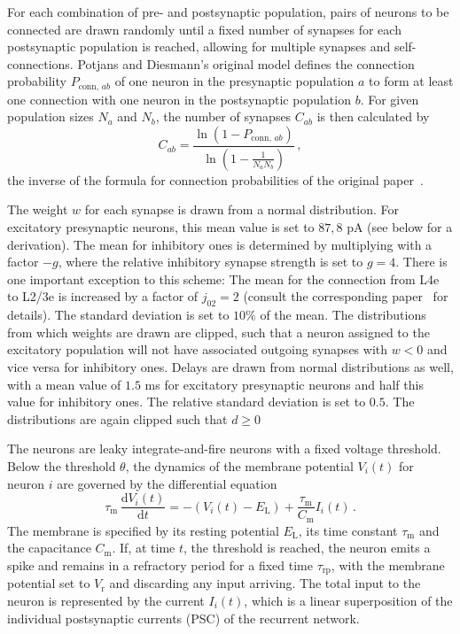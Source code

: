 For each combination of pre- and postsynaptic population, pairs of neurons to be connected are drawn
randomly until a fixed number of synapses for each postsynaptic population is reached, 
allowing for multiple synapses and self-connections. 
Potjans and Diesmann's original model defines the connection probability $P_{\text{conn}, \,ab}$ 
of one neuron in the presynaptic population $a$ to form at least one connection with one neuron in 
the postsynaptic population $b$. For given population sizes $N_a$ and $N_b$, the number of 
synapses $C_{ab}$ is then calculated by
\begin{equation}
    C_{ab} = \frac{\ln \left( 1 - P_{\text{conn}, \,ab} \right)}{\ln \left( 1 - \frac{1}{N_a N_b} \right)} \, ,
    \label{eq:synapse_numbers}
\end{equation}
the inverse of the formula for connection probabilities of the original paper~\cite{potjans2014}.

The weight $w$ for each synapse is drawn from a normal distribution.
For excitatory presynaptic neurons, this mean value is set to $87,8$ pA (see below for 
a derivation). The mean for inhibitory ones is determined by multiplying 
with a factor $-g$, where the relative inhibitory synapse strength is set to 
$g = 4$. There is one important exception to this scheme:
The mean for the connection from L4e to L2/3e is increased by a factor of 
$j_{02} = 2$ (consult the corresponding paper~\cite{potjans2014} for details). 
The standard deviation is set to $10\%$ of the mean. 
The distributions from which weights are drawn are clipped, 
such that a neuron assigned to the excitatory 
population will not have associated outgoing synapses with $w < 0$ 
and vice versa for inhibitory ones. 
Delays are drawn from normal distributions as well, with a mean value 
of $1.5$ ms for excitatory presynaptic neurons and half this value for 
inhibitory ones. The relative standard deviation is set to $0.5$. The distributions
are again clipped such that $d \ge 0$

The neurons are leaky integrate-and-fire neurons with a fixed voltage threshold. 
Below the threshold $\theta$, the dynamics of the membrane potential $V_i(t)$ 
for neuron $i$ are governed by the differential equation 
\begin{equation}
    \tau_\text{m} \,\frac{\text{d} V_i(t)}{\text{d} t} 
            = -(V_i(t) - E_\text{L}) + \frac{\tau_\text{m}}{C_\text{m}} I_i(t) \, .
    \label{eq:leaky_integrator}
\end{equation}
The membrane is specified by its resting potential $E_\text{L}$, 
its time constant $\tau_\text{m}$ and the capacitance $C_\text{m}$.
If, at time $t$, the threshold is reached, the neuron emits a spike and remains 
in a refractory period for a fixed time $\tau_\text{rp}$, with the membrane 
potential set to $V_\text{r}$ and discarding any input arriving. 
The total input to the neuron is represented by 
the current $I_i(t)$, which is a linear superposition of the individual 
postsynaptic currents (PSC) of the recurrent network.

